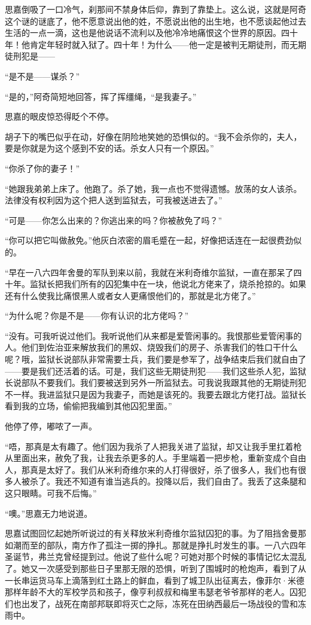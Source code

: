 \par 思嘉倒吸了一口冷气，刹那间不禁身体后仰，靠到了靠垫上。这么说，这就是阿奇这个谜的谜底了，他不愿意说出他的姓，不愿说出他的出生地，也不愿谈起他过去生活的一点一滴，这也是他说话不流利以及他冷冷地痛恨这个世界的原因。四十年！他肯定年轻时就入狱了。四十年！为什么——他一定是被判无期徒刑，而无期徒刑犯是——
\par “是不是——谋杀？”
\par “是的，”阿奇简短地回答，挥了挥缰绳，“是我妻子。”
\par 思嘉的眼皮惊恐得眨个不停。
\par 胡子下的嘴巴似乎在动，好像在阴险地笑她的恐惧似的。“我不会杀你的，夫人，要是你就是为这个感到不安的话。杀女人只有一个原因。”
\par “你杀了你的妻子！”
\par “她跟我弟弟上床了。他跑了。杀了她，我一点也不觉得遗憾。放荡的女人该杀。法律没有权利因为这个把人送到监狱去，可我被送进去了。”
\par “可是——你怎么出来的？你逃出来的吗？你被赦免了吗？”
\par “你可以把它叫做赦免。”他灰白浓密的眉毛蹙在一起，好像把话连在一起很费劲似的。
\par “早在一八六四年舍曼的军队到来以前，我就在米利奇维尔监狱，一直在那呆了四十年。监狱长把我们所有的囚犯集中在一块，他说北方佬来了，烧杀抢掠的。如果还有什么使我比痛恨黑人或者女人更痛恨他们的，那就是北方佬了。”
\par “为什么呢？你是不是——你有认识的北方佬吗？”
\par “没有。可我听说过他们。我听说他们从来都是爱管闲事的。我恨那些爱管闲事的人。他们到佐治亚来解放我们的黑奴、烧毁我们的房子、杀害我们的牲口干什么呢？哦，监狱长说部队非常需要士兵，我们要是参军了，战争结束后我们就自由了——要是我们还活着的话。可是，我们这些无期徒刑犯——我们这些杀人犯，监狱长说部队不要我们。我们要被送到另外一所监狱去。可我说我跟其他的无期徒刑犯不一样。我进监狱只是因为我妻子，而她是该死的。我要去跟北方佬打战。监狱长看到我的立场，偷偷把我编到其他囚犯里面。”
\par 他停了停，嘟哝了一声。
\par “唔，那真是太有趣了。他们因为我杀了人把我关进了监狱，却又让我手里扛着枪从里面出来，赦免了我，让我去杀更多的人。手里端着一把步枪，重新变成个自由人，那真是太好了。我们从米利奇维尔来的人打得很好，杀了很多人，我们也有很多人被杀了。我还不知道有谁当逃兵的。投降以后，我们自由了。我丢了这条腿和这只眼睛。可我不后悔。”
\par “噢。”思嘉无力地说道。
\par 思嘉试图回忆起她所听说过的有关释放米利奇维尔监狱囚犯的事。为了阻挡舍曼那如潮而至的部队，南方作了孤注一掷的挣扎。那就是挣扎时发生的事。一八六四年圣诞节，弗兰克曾经提到过。他说了些什么呢？可她对那个时候的事情记忆太混乱了。她又一次感受到那些日子里那无限的恐惧，听到了围城时的枪炮声，看到了从一长串运货马车上滴落到红土路上的鲜血，看到了城卫队出征离去，像菲尔·米德那样年龄不大的军校学员和孩子，像亨利叔叔和梅里韦瑟老爷爷那样的老人。囚犯们也出发了，战死在南部邦联即将灭亡之际，冻死在田纳西最后一场战役的雪和冻雨中。
